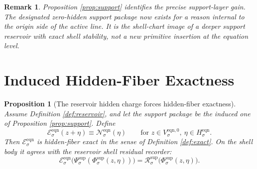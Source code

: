 \documentclass[11pt]{article}
\newcommand{\EqnResidual}[1]{\mathcal E_{#1}^{\mathrm{eqn}}}
\newcommand{\EqnZero}[1]{V_{#1}^{\mathrm{eqn},0}}
\newcommand{\EqnHidden}[1]{H_{#1}^{\mathrm{eqn}}}
\newcommand{\EqnLin}[1]{\mathcal N_{#1}^{\mathrm{eqn}}}
\newcommand{\ShellChart}[1]{\Psi_{#1}^{\mathrm{sup}}}
\newcommand{\SplitMap}[1]{\Phi_{#1}^{\mathrm{sup}}}
\newcommand{\ResResidual}[1]{\mathcal R_{#1}^{\mathrm{sup}}}
\newtheorem{proposition}{Proposition}
\newtheorem{remark}{Remark}
\begin{document}
\begin{remark}
Proposition \ref{prop:support} identifies the precise support-layer gain. The designated zero-hidden support package now exists for a reason internal to the origin side of the active line. It is the shell-chart image of a deeper support reservoir with exact shell stability, not a new primitive insertion at the equation level.
\end{remark}

\section{Induced Hidden-Fiber Exactness}

\begin{proposition}[The reservoir hidden charge forces hidden-fiber exactness]
\label{prop:exact}
Assume Definition \ref{def:reservoir}, and let the support package be the induced one of Proposition \ref{prop:support}. Define
\begin{equation}
\EqnResidual{\sigma}(z+\eta)
\equiv
\EqnLin{\sigma}(\eta)
\qquad
\text{for }z\in\EqnZero{\sigma},\ \eta\in\EqnHidden{\sigma}.
\label{eq:inducedresidual}
\end{equation}
Then \(\EqnResidual{\sigma}\) is hidden-fiber exact in the sense of Definition \ref{def:exact}. On the shell body it agrees with the reservoir shell residual recorder:
\begin{equation}
\EqnResidual{\sigma}\bigl(\ShellChart{\sigma}(\SplitMap{\sigma}(z,\eta))\bigr)
=
\ResResidual{\sigma}\bigl(\SplitMap{\sigma}(z,\eta)\bigr).
\label{eq:residualagreement}
\end{equation}
\end{proposition}
\end{document}
